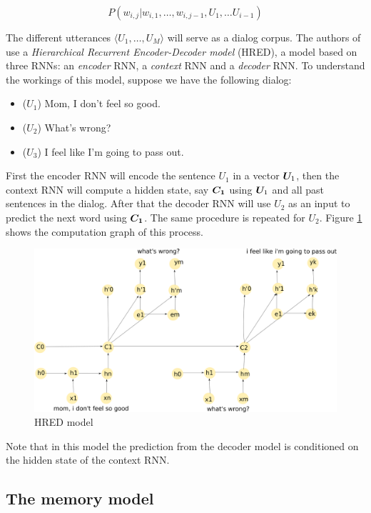 \begin{equation}
P(w_{i,j} | w_{i,1}, \dots , w_{i,j-1}, U_{1}, \dots U_{i-1})
\end{equation}

The different utterances $\langle U_1 , \dots, U_M \rangle$ will serve as a dialog corpus.
The authors of \cite{Serban:2016a} use a \textit{Hierarchical Recurrent Encoder-Decoder model} (HRED), a model based on three RNNs: an \textit{encoder} RNN, a \textit{context} RNN and a \textit{decoder} RNN.  To understand the workings of this model, suppose we have the following dialog:
\begin{itemize}
\item ($U_1$) Mom, I don't feel so good.\\
\item ($U_2$) What's wrong?\\
\item ($U_3$) I feel like I'm going to pass out.
\end{itemize}

First the encoder RNN will encode the sentence $U_1$ in a vector $\bm{U}_1$, then the context RNN will compute a hidden state, say $\bm{C_1}$ using $\bm{U}_1$ and all past sentences in the dialog. After that the decoder RNN will use $U_2$ as an input to predict the next word using $\bm{C_1}$. The same procedure is repeated for $U_2$. Figure \ref{HRED} shows the computation graph of this process.

\begin{figure}[h]
\label{HRED}
\includegraphics[width=12cm]{img/HRED_placeholder.png}
\caption{HRED model}
\end{figure}

Note that in this model the prediction from the decoder model is conditioned on the hidden state of the context RNN.

\subsection{The memory model} 

